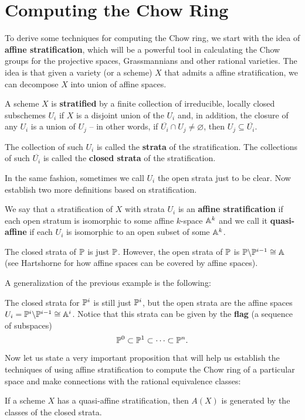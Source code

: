 \section{Computing the Chow Ring}
\label{sec:computing-the-chow-ring}
To derive some techniques for computing the Chow ring,
we start with the idea of \textbf{affine stratification},
which will be a powerful tool in calculating the Chow groups 
for the projective spaces, Grassmannians and other rational varieties.
The idea is that given a variety (or a scheme) $X$ that admits a affine stratification,
we can decompose $X$ into union of affine spaces.
	\begin{definition}
		A scheme $X$ is \textbf{stratified} by a finite collection of 
		irreducible, locally closed subschemes $U_i$ 
		if $X$ is a disjoint union of the $U_i$ and,
		in addition,
		the closure of any $U_i$ is a union of $U_j$ 
		-- in other words, 
		if $\overline{U_i} \cap U_j \ne \varnothing$,
		then $U_j \subseteq \overline{U_i}$.
		
		The collection of such $U_i$ is called the \textbf{strata} 
		of the stratification. 
		The collections of such $\overline{U_i}$ is called 
		the \textbf{closed strata} of the stratification.	
	\end{definition}
In the same fashion, sometimes we call $U_i$ 
the open strata just to be clear. Now establish two more definitions based on stratification.
	\begin{definition}
	\label{def:stratification}
		We say that a stratification of $X$ with strata $U_i$ is
		an \textbf{affine stratification} 
		if each open stratum is isomorphic to 
		some affine $k$-space $\A^k$
		and we call it \textbf{quasi-affine} 
		if each $U_i$ is isomorphic to an open subset of some $\A^k$.
	\end{definition}

	\begin{example}[Strata of $\P$]
		The closed strata of $\P$ is just $\P$.
		However, the open strata of $\P$ is  
		$\P \backslash \P^{i - 1} \cong \A$
		(see Hartshorne for how affine spaces can be covered 
		by affine spaces).
	\end{example}
	
A generalization of the previous example is the following:
	\begin{example}[Strata of $\P^i$]
		The closed strata for $\P^i$ is still just $\P^i$,
		but the open strata are the affine spaces
		$U_i = \P^i \backslash \P^{i-1} \cong \A^i$. 
		Notice that this strata can be given by the 
		\textbf{flag} (a sequence of subspaces) 
		\[
		\P^0 \subset \P^1 \subset \cdots \subset \P^n.
		\]
	\end{example}

Now let us state a very important proposition
that will help us establish the techniques of using affine stratification 
to compute the Chow ring of a particular space
and make connections with the rational equivalence classes:
	\begin{proposition}
		If a scheme $X$ has a quasi-affine stratification,
		then $A(X)$ is generated by the classes of the closed strata.
	\end{proposition}